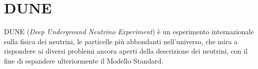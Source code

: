\documentclass[../main.tex]{subfiles}
\begin{document}
\chapter{DUNE} \label{ch:dune}
  DUNE (\textit{Deep Underground Neutrino Experiment}) è un esperimento
  internazionale sulla fisica dei neutrini, le particelle più abbondanti
  nell'universo, che mira a rispondere ai diversi problemi ancora aperti della
  descrizione dei neutrini, con il fine di espandere ulteriormente il Modello
  Standard.

  

  

  
\end{document}

